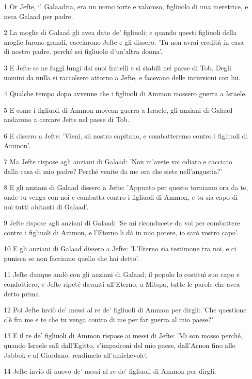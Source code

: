 \par 1 Or Jefte, il Galaadita, era un uomo forte e valoroso, figliuolo di una meretrice, e avea Galaad per padre.
\par 2 La moglie di Galaad gli avea dato de' figliuoli; e quando questi figliuoli della moglie furono grandi, cacciarono Jefte e gli dissero: 'Tu non avrai eredità in casa di nostro padre, perché sei figliuolo d'un'altra donna'.
\par 3 E Jefte se ne fuggì lungi dai suoi fratelli e si stabilì nel paese di Tob. Degli uomini da nulla si raccolsero attorno a Jefte, e facevano delle incursioni con lui.
\par 4 Qualche tempo dopo avvenne che i figliuoli di Ammon mossero guerra a Israele.
\par 5 E come i figliuoli di Ammon movean guerra a Israele, gli anziani di Galaad andarono a cercare Jefte nel paese di Tob.
\par 6 E dissero a Jefte: 'Vieni, sii nostro capitano, e combatteremo contro i figliuoli di Ammon'.
\par 7 Ma Jefte rispose agli anziani di Galaad: 'Non m'avete voi odiato e cacciato dalla casa di mio padre? Perché venite da me ora che siete nell'angustia?'
\par 8 E gli anziani di Galaad dissero a Jefte: 'Appunto per questo torniamo ora da te, onde tu venga con noi e combatta contro i figliuoli di Ammon, e tu sia capo di noi tutti abitanti di Galaad'.
\par 9 Jefte rispose agli anziani di Galaad: 'Se mi riconducete da voi per combattere contro i figliuoli di Ammon, e l'Eterno li dà in mio potere, io sarò vostro capo'.
\par 10 E gli anziani di Galaad dissero a Jefte: 'L'Eterno sia testimone tra noi, e ci punisca se non facciamo quello che hai detto'.
\par 11 Jefte dunque andò con gli anziani di Galaad; il popolo lo costituì suo capo e condottiero, e Jefte ripeté davanti all'Eterno, a Mitspa, tutte le parole che avea detto prima.
\par 12 Poi Jefte inviò de' messi al re de' figliuoli di Ammon per dirgli: 'Che questione c'è fra me e te che tu venga contro di me per far guerra al mio paese?'
\par 13 E il re de' figliuoli di Ammon rispose ai messi di Jefte: 'Mi son mosso perché, quando Israele salì dall'Egitto, s'impadronì del mio paese, dall'Arnon fino allo Jabbok e al Giordano; rendimelo all'amichevole'.
\par 14 Jefte inviò di nuovo de' messi al re de' figliuoli di Ammon per dirgli:
